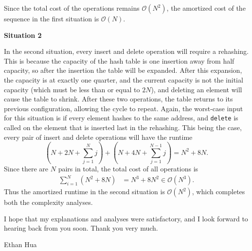 \documentclass[11pt]{article}
\begin{document}
    Since the total cost of the operations remains \(\mathcal{O} (N^2)\), the amortized cost of the sequence in the first situation is \(\mathcal{O} (N)\).

    \medskip

    \textbf{Situation 2}

    In the second situation, every insert and delete operation will require a rehashing. This is because the capacity of the hash table is one insertion away from half capacity, so after the insertion the table will be expanded. After this expansion, the capacity is at exactly one quarter, and the current capacity is not the initial capacity (which must be less than or equal to \(2N\)), and deleting an element will cause the table to shrink. After these two operations, the table returns to its previous configuration, allowing the cycle to repeat. Again, the worst-case input for this situation is if every element hashes to the same address, and \texttt{delete} is called on the element that is inserted last in the rehashing. This being the case, every pair of insert and delete operations will have the runtime
    \[
        \left(N + 2N + \sum_{j=1}^{N} j\right) + \left( N + 4N + \sum_{j=1}^{N-1} j \right) = N^2 + 8N.
    \]
    Since there are \(N\) pairs in total, the total cost of all operations is
    \begin{align*}
        \sum_{i=1}^{N} (N^2 + 8N) &= N^3 + 8N^2 \in \mathcal{O} (N^3).
    \end{align*}
    Thus the amortized runtime in the second situation is \(\mathcal{O} (N^2)\), which completes both the complexity analyses.
    
    I hope that my explanations and analyses were satisfactory, and I look forward to hearing back from you soon. Thank you very much.

    \medskip

    Ethan Hua
\end{document}
